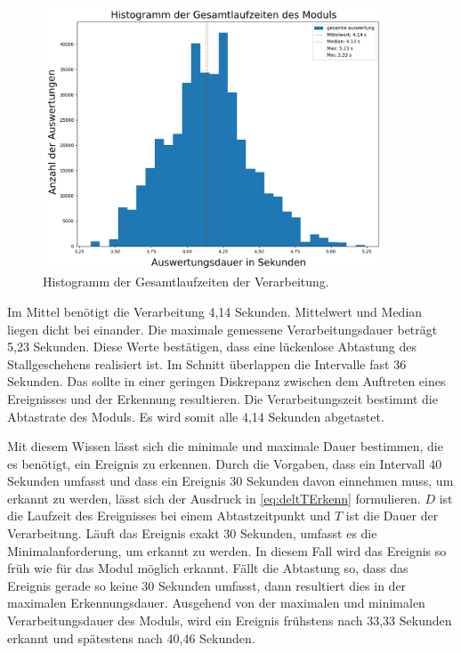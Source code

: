 \begin{figure}[htb]
    \centering
    \includegraphics[width=0.9\textwidth]{img/Plots/Simulation/Auswertung Runtimes Histogram gesamte auswertung mit Frames.png}
    \caption{Histogramm der Gesamtlaufzeiten der Verarbeitung.}
    \label{fig:HistGesamt}
\end{figure}

Im Mittel benötigt die Verarbeitung 4,14 Sekunden. Mittelwert und Median liegen dicht bei einander. Die maximale gemessene Verarbeitungsdauer beträgt 5,23 Sekunden. Diese Werte bestätigen, dass eine lückenlose Abtastung des Stallgeschehens realisiert ist. Im Schnitt überlappen die Intervalle fast 36 Sekunden. Das sollte in einer geringen Diskrepanz zwischen dem Auftreten eines Ereignisses und der Erkennung resultieren. Die Verarbeitungszeit bestimmt die Abtastrate des Moduls. Es wird somit alle 4,14 Sekunden abgetastet. \par

Mit diesem Wissen lässt sich die minimale und maximale Dauer bestimmen, die es benötigt, ein Ereignis zu erkennen. Durch die Vorgaben, dass ein Intervall 40 Sekunden umfasst und dass ein Ereignis 30 Sekunden davon einnehmen muss, um erkannt zu werden, lässt sich der Ausdruck in \autoref{eq:deltTErkenn} formulieren. \(D\) ist die Laufzeit des Ereignisses bei einem Abtastzeitpunkt und \(T\) ist die Dauer der Verarbeitung. Läuft das Ereignis exakt 30 Sekunden, umfasst es die Minimalanforderung, um erkannt zu werden. In diesem Fall wird das Ereignis so früh wie für das Modul möglich erkannt. Fällt die Abtastung so, dass das Ereignis gerade so keine 30 Sekunden umfasst, dann resultiert dies in der maximalen Erkennungsdauer. Ausgehend von der maximalen und minimalen Verarbeitungsdauer des Moduls, wird ein Ereignis frühstens nach 33,33 Sekunden erkannt und spätestens nach 40,46 Sekunden.

